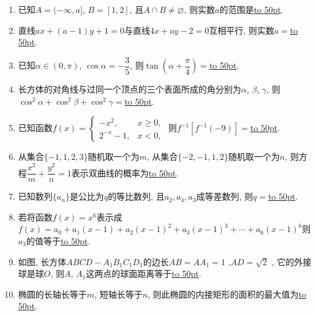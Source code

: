 \documentclass[10pt,a4paper]{article}
\newcommand{\blank}[1]{\underline{\hbox to #1pt{}}}
\begin{document}
\begin{enumerate}[1.]
\item 已知$A=(-\infty,a]$, $B=[1,2]$, 且$A\cap B\ne \varnothing$, 则实数$a$的范围是\blank{50}.
\item 直线$ax+(a-1)y+1=0$与直线$4x+ay-2=0$互相平行, 则实数$a=$\blank{50}.
\item 已知$\alpha \in (0,\pi)$, $\cos\alpha =-\dfrac35$, 则$\tan(\alpha+\dfrac{\pi}4)=$\blank{50}.
\item 长方体的对角线与过同一个顶点的三个表面所成的角分别为$\alpha$, $\beta$, $\gamma$, 则$\cos^2\alpha+\cos^2\beta+\cos^2\gamma =$\blank{50}.
\item 已知函数$f(x)=\begin{cases} -x^2, & x\ge 0,  \\2^{-x}-1, & x<0, \end{cases}$ 则$f^{-1}[f^{-1}(-9)]=$\blank{50}.
\item 从集合$\{-1,1,2,3\}$随机取一个为$m$, 从集合$\{-2,-1,1,2\}$随机取一个为$n$, 则方程$\dfrac{x^2}m+\dfrac{y^2}n=1$表示双曲线的概率为\blank{50}.
\item 已知数列$\{a_n\}$是公比为$q$的等比数列, 且$a_2,a_4,a_3$成等差数列, 则$q=$\blank{50}.
\item 若将函数$f(x)=x^6$表示成$f(x)=a_0+a_1(x-1)+a_2(x-1)^2+a_3(x-1)^3+\cdots+a_6(x-1)^6$则$a_3$的值等于\blank{50}.
\item 如图, 长方体$ABCD-A_1B_1C_1D_1$的边长$AB=AA_1=1$ ,$AD=\sqrt2$ , 它的外接球是球$O$, 则$A$, $A_1$这两点的球面距离等于\blank{50}.
\begin{center}
\end{center}
\item 椭圆的长轴长等于$m$, 短轴长等于$n$, 则此椭圆的内接矩形的面积的最大值为\blank{50}.



\end{enumerate}
\end{document}
